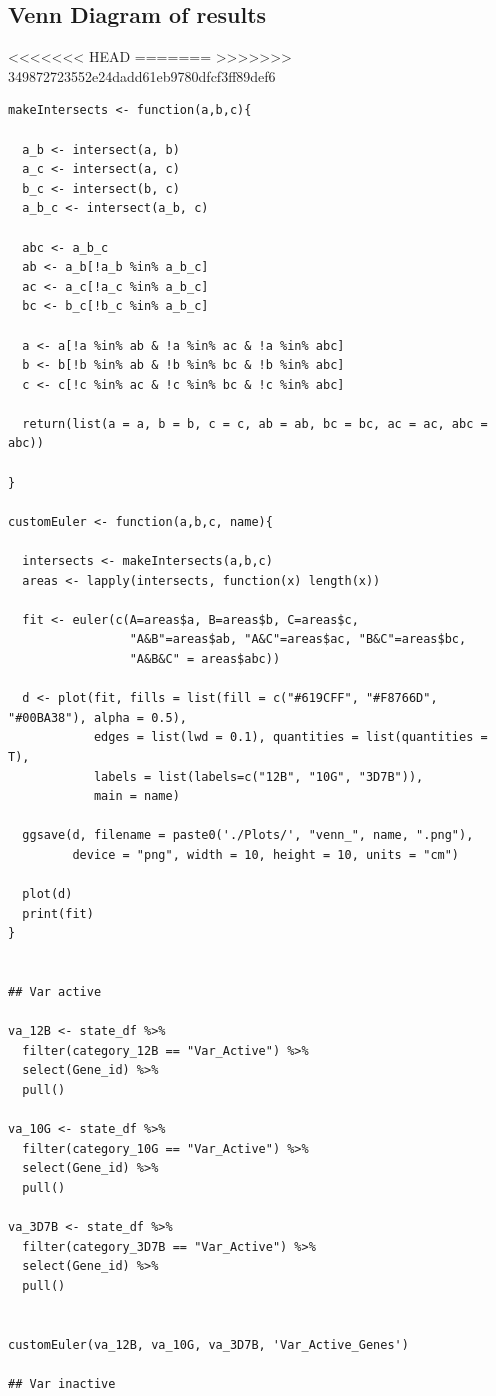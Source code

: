 \documentclass[11pt]{article}
\begin{document}
\subsection{Venn Diagram of results}
<<<<<<< HEAD
\label{sec:org1f63139}
=======
\label{sec:org403f98a}
>>>>>>> 349872723552e24dadd61eb9780dfcf3ff89def6
\begin{verbatim}
makeIntersects <- function(a,b,c){

  a_b <- intersect(a, b)
  a_c <- intersect(a, c)
  b_c <- intersect(b, c)
  a_b_c <- intersect(a_b, c)

  abc <- a_b_c
  ab <- a_b[!a_b %in% a_b_c]
  ac <- a_c[!a_c %in% a_b_c]
  bc <- b_c[!b_c %in% a_b_c]

  a <- a[!a %in% ab & !a %in% ac & !a %in% abc]
  b <- b[!b %in% ab & !b %in% bc & !b %in% abc]
  c <- c[!c %in% ac & !c %in% bc & !c %in% abc]

  return(list(a = a, b = b, c = c, ab = ab, bc = bc, ac = ac, abc = abc))

}

customEuler <- function(a,b,c, name){

  intersects <- makeIntersects(a,b,c)
  areas <- lapply(intersects, function(x) length(x))

  fit <- euler(c(A=areas$a, B=areas$b, C=areas$c,
                 "A&B"=areas$ab, "A&C"=areas$ac, "B&C"=areas$bc,
                 "A&B&C" = areas$abc))

  d <- plot(fit, fills = list(fill = c("#619CFF", "#F8766D", "#00BA38"), alpha = 0.5),
            edges = list(lwd = 0.1), quantities = list(quantities = T),
            labels = list(labels=c("12B", "10G", "3D7B")),
            main = name)

  ggsave(d, filename = paste0('./Plots/', "venn_", name, ".png"),
         device = "png", width = 10, height = 10, units = "cm")

  plot(d)
  print(fit)
}


## Var active

va_12B <- state_df %>%
  filter(category_12B == "Var_Active") %>%
  select(Gene_id) %>%
  pull()

va_10G <- state_df %>%
  filter(category_10G == "Var_Active") %>%
  select(Gene_id) %>%
  pull()

va_3D7B <- state_df %>%
  filter(category_3D7B == "Var_Active") %>%
  select(Gene_id) %>%
  pull()


customEuler(va_12B, va_10G, va_3D7B, 'Var_Active_Genes')

## Var inactive


\end{verbatim}
\end{document}
